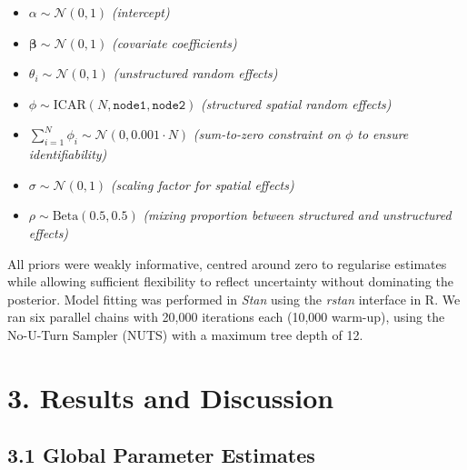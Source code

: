 \documentclass[11pt]{article}
\begin{document}
	\begin{itemize}
		\item $\alpha \sim \mathcal{N}(0, 1)$ \hfill \textit{(intercept)}
		\item $\boldsymbol{\beta} \sim \mathcal{N}(0, 1)$ \hfill \textit{(covariate coefficients)}
		\item $\theta_i \sim \mathcal{N}(0, 1)$ \hfill \textit{(unstructured random effects)}
		\item $\phi \sim \text{ICAR}(N, \texttt{node1}, \texttt{node2})$ \hfill \textit{(structured spatial random effects)}
		\item $\textstyle \sum_{i=1}^N \phi_i \sim \mathcal{N}(0, 0.001 \cdot N)$ \hfill \textit{(sum-to-zero constraint on $\phi$ to ensure identifiability)}
		\item $\sigma \sim \mathcal{N}(0, 1)$ \hfill \textit{(scaling factor for spatial effects)}
		\item $\rho \sim \text{Beta}(0.5, 0.5)$ \hfill \textit{(mixing proportion between structured and unstructured effects)}
	\end{itemize}
	
	\vspace{1em}
	
	All priors were weakly informative, centred around zero to regularise estimates while allowing sufficient flexibility to reflect uncertainty without dominating the posterior. Model fitting was performed in \textit{Stan} using the \textit{rstan} interface in R. We ran six parallel chains with 20,000 iterations each (10,000 warm-up), using the No-U-Turn Sampler (NUTS) with a maximum tree depth of 12.
	
	\newpage
	\section*{3. Results and Discussion}
	
	\subsection*{3.1 Global Parameter Estimates}
	
\end{document}
